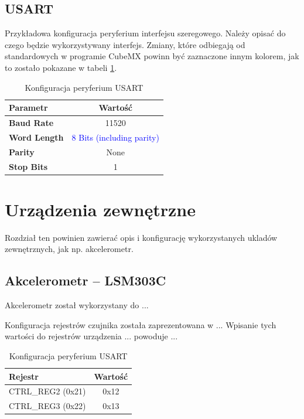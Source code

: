 \documentclass[10pt, a4paper]{article}
\begin{document}
\subsection{USART}

Przykładowa konfiguracja peryferium interfejsu szeregowego.
Należy opisać do czego będzie wykorzystywany interfejs. 
Zmiany, które odbiegają od standardowych w programie CubeMX 
powinn być zaznaczone innym kolorem, jak to zostało pokazane 
w tabeli \ref{tab:USART}.

\begin{table}[H]
	\centering
	\begin{tabular}{|l|c|} \hline
		\textbf{Parametr} & Wartość \\
		\hline
		\hline  \textbf{Baud Rate}&11520  \\\hline
		\textbf{Word Length } & \textcolor{blue}{8 Bits (including parity)}\\\hline
		\textbf{Parity} &  None\\
		\hline
		\textbf{Stop Bits}& 1\\
		\hline
	\end{tabular}
	\caption{Konfiguracja peryferium USART}
	\label{tab:USART}
\end{table}

\section{Urządzenia zewnętrzne}

Rozdział ten powinien zawierać opis i konfigurację wykorzystanych ukladów
zewnętrznych, jak np. akcelerometr.

\subsection{Akcelerometr -- LSM303C}

Akcelerometr został wykorzystany do ...

Konfiguracja rejestrów czujnika została zaprezentowana w ...
Wpisanie tych wartości do rejestrów urządzenia ... powoduje ...

\begin{table}[H]
	\centering
	\begin{tabular}{|l|c|} \hline
		\textbf{Rejestr} & Wartość \\
		\hline
		\hline
		CTRL\_REG2 (0x21) & 0x12\\\hline
		CTRL\_REG3 (0x22) & 0x13\\\hline
	\end{tabular}
	\caption{Konfiguracja peryferium USART}
	\label{tab:Akcelerometr}
\end{table}
\end{document}
